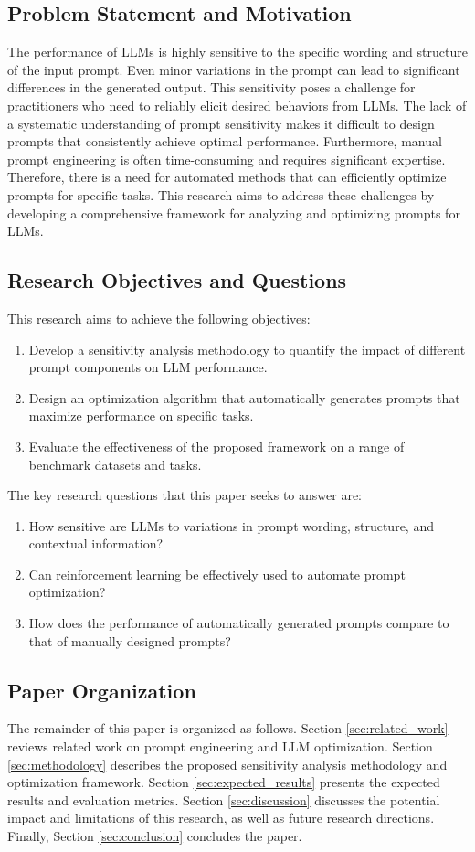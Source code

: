 \documentclass{article}
\begin{document}
\subsection{Problem Statement and Motivation}
The performance of LLMs is highly sensitive to the specific wording and structure of the input prompt. Even minor variations in the prompt can lead to significant differences in the generated output. This sensitivity poses a challenge for practitioners who need to reliably elicit desired behaviors from LLMs. The lack of a systematic understanding of prompt sensitivity makes it difficult to design prompts that consistently achieve optimal performance. Furthermore, manual prompt engineering is often time-consuming and requires significant expertise. Therefore, there is a need for automated methods that can efficiently optimize prompts for specific tasks. This research aims to address these challenges by developing a comprehensive framework for analyzing and optimizing prompts for LLMs.

\subsection{Research Objectives and Questions}
This research aims to achieve the following objectives:
\begin{enumerate}
    \item Develop a sensitivity analysis methodology to quantify the impact of different prompt components on LLM performance.
    \item Design an optimization algorithm that automatically generates prompts that maximize performance on specific tasks.
    \item Evaluate the effectiveness of the proposed framework on a range of benchmark datasets and tasks.
\end{enumerate}

The key research questions that this paper seeks to answer are:
\begin{enumerate}
    \item How sensitive are LLMs to variations in prompt wording, structure, and contextual information?
    \item Can reinforcement learning be effectively used to automate prompt optimization?
    \item How does the performance of automatically generated prompts compare to that of manually designed prompts?
\end{enumerate}

\subsection{Paper Organization}
The remainder of this paper is organized as follows. Section \ref{sec:related_work} reviews related work on prompt engineering and LLM optimization. Section \ref{sec:methodology} describes the proposed sensitivity analysis methodology and optimization framework. Section \ref{sec:expected_results} presents the expected results and evaluation metrics. Section \ref{sec:discussion} discusses the potential impact and limitations of this research, as well as future research directions. Finally, Section \ref{sec:conclusion} concludes the paper.
\end{document}
